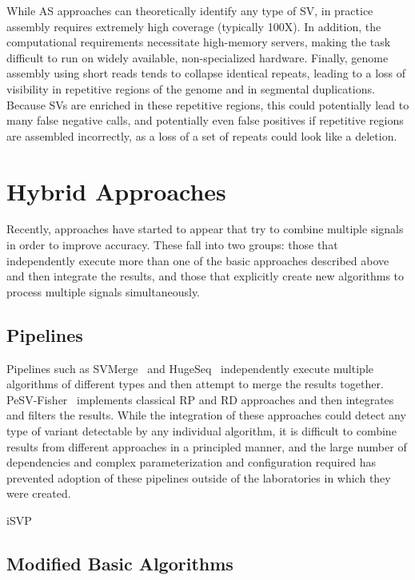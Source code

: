 While AS approaches can theoretically identify any type of SV, in practice assembly requires extremely high coverage (typically 100X). In addition, the computational requirements necessitate high-memory servers, making the task difficult to run on widely available, non-specialized hardware. Finally, genome assembly using short reads tends to collapse identical repeats, leading to a loss of visibility in repetitive regions of the genome and in segmental duplications\cite{Alkan:2011hs}. Because SVs are enriched in these repetitive regions, this could potentially lead to many false negative calls, and potentially even false positives if repetitive regions are assembled incorrectly, as a loss of a set of repeats could look like a deletion.

\section{Hybrid Approaches}

Recently, approaches have started to appear that try to combine multiple signals in order to improve accuracy. These fall into two groups: those that independently execute more than one of the basic approaches described above and then integrate the results, and those that explicitly create new algorithms to process multiple signals simultaneously.

\subsection{Pipelines}

Pipelines such as SVMerge~\cite{Wong:2010p1271} and HugeSeq~\cite{Lam:2012jy} independently execute multiple algorithms of different types and then attempt to merge the results together. PeSV-Fisher~\cite{Escaramis:2013dm} implements classical RP and RD approaches and then integrates and filters the results. While the integration of these approaches could detect any type of variant detectable by any individual algorithm, it is difficult to combine results from different approaches in a principled manner, and the large number of dependencies and complex parameterization and configuration required has prevented adoption of these pipelines outside of the laboratories in which they were created.

iSVP

\subsection{Modified Basic Algorithms}

